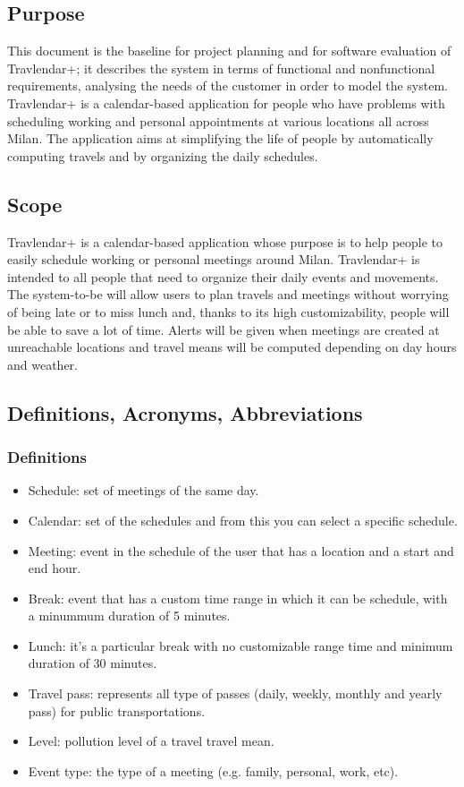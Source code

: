 \subsection{Purpose}
This document is the baseline for project planning and for software evaluation of Travlendar+; it describes the system in terms of functional and nonfunctional requirements, analysing the needs of the customer in order to model the system.\\
Travlendar+ is a calendar-based application for people who have problems with scheduling working and personal appointments at various locations all across Milan. The application aims at simplifying the life of people by automatically computing travels and by organizing the daily schedules.

\subsection{Scope}
Travlendar+ is a calendar-based application whose purpose is to help people to easily schedule working or personal meetings around Milan.
Travlendar+ is intended to all people that need to organize their daily events and movements. The system-to-be will allow users to plan travels and meetings without worrying of being late or to miss lunch and, thanks to its high customizability, people will be able to save a lot of time. Alerts will be given when meetings are created at unreachable locations and travel means will be computed depending on day hours and weather.

\subsection{Definitions, Acronyms, Abbreviations}

\subsubsection{Definitions}
\begin{itemize}
\renewcommand{\labelitemi}{$-$}
\item
Schedule: set of meetings of the same day.
\item
Calendar: set of the schedules and from this you can select a specific schedule.
\item
Meeting: event in the schedule of the user that has a location and a start and end hour.
\item
Break: event that has a custom time range in which it can be schedule, with a minummum duration of 5 minutes.
\item
Lunch: it's a particular break with no customizable range time and minimum duration of 30 minutes.
\item
Travel pass: represents all type of passes (daily, weekly, monthly and yearly pass) for public transportations.
\item
Level: pollution level of a travel travel mean. 
\item
Event type: the type of a meeting (e.g. family, personal, work, etc). 
\end{itemize}



